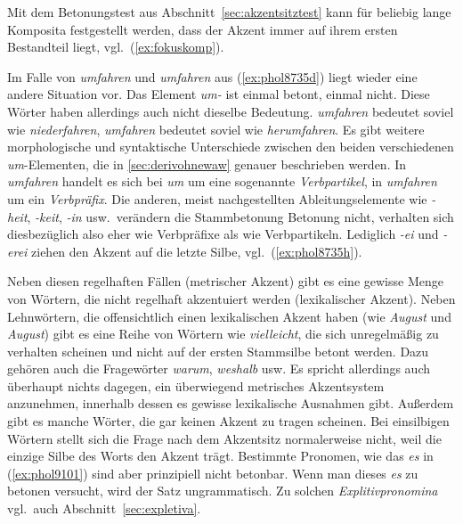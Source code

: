 Mit dem Betonungstest aus Abschnitt~\ref{sec:akzentsitztest} kann für beliebig lange Komposita festgestellt werden, dass der Akzent immer auf ihrem ersten Bestandteil liegt, vgl.\ (\ref{ex:fokuskomp}).

\begin{exe}
  \ex\label{ex:fokuskomp}
  \begin{xlist}
  \end{xlist}
\end{exe}

Im Falle von \textit{\Akz umfahren} und \textit{um\Akz fahren} aus (\ref{ex:phol8735d}) liegt wieder eine andere Situation vor.
Das Element \textit{um-} ist einmal betont, einmal nicht.
Diese Wörter haben allerdings auch nicht dieselbe Bedeutung.
\textit{\Akz umfahren} bedeutet soviel wie \textit{niederfahren}, \textit{um\Akz fahren} bedeutet soviel wie \textit{herumfahren}.
Es gibt weitere morphologische und syntaktische Unterschiede zwischen den beiden verschiedenen \textit{um}-Elementen, die in \ref{sec:derivohnewaw} genauer beschrieben werden.
In \textit{\Akz umfahren} handelt es sich bei \textit{um} um eine sogenannte \textit{Verbpartikel}, in \textit{um\Akz fahren} um ein \textit{Verbpräfix}.
Die anderen, meist nachgestellten Ableitungselemente wie \textit{-heit}, \textit{-keit}, \textit{-in} usw.\ verändern die Stammbetonung Betonung nicht, verhalten sich diesbezüglich also eher wie Verbpräfixe als wie Verbpartikeln.
Lediglich \textit{-ei} und \textit{-erei} ziehen den Akzent auf die letzte Silbe, vgl.\ (\ref{ex:phol8735h}).


Neben diesen regelhaften Fällen (metrischer Akzent) gibt es eine gewisse Menge von Wörtern, die nicht regelhaft akzentuiert werden (lexikalischer Akzent).
Neben Lehnwörtern, die offensichtlich einen lexikalischen Akzent haben (wie \textit{\Akz August} und \textit{Au\Akz gust}) gibt es eine Reihe von Wörtern wie \textit{vie\Akz lleicht}, die sich unregelmäßig zu verhalten scheinen und nicht auf der ersten Stammsilbe betont werden.
Dazu gehören auch die Fragewörter \textit{wa\Akz rum}, \textit{wes\Akz halb} usw.
Es spricht allerdings auch überhaupt nichts dagegen, ein überwiegend metrisches Akzentsystem anzunehmen, innerhalb dessen es gewisse lexikalische Ausnahmen gibt.
Außerdem gibt es manche Wörter, die gar keinen Akzent zu tragen scheinen.
Bei einsilbigen Wörtern stellt sich die Frage nach dem Akzentsitz normalerweise nicht, weil die einzige Silbe des Worts den Akzent trägt.
Bestimmte Pronomen, wie das \textit{es} in (\ref{ex:phol9101}) sind aber prinzipiell nicht betonbar.
Wenn man dieses \textit{es} zu betonen versucht, wird der Satz ungrammatisch.
Zu solchen \textit{Explitivpronomina} vgl.\ auch Abschnitt~\ref{sec:expletiva}.

